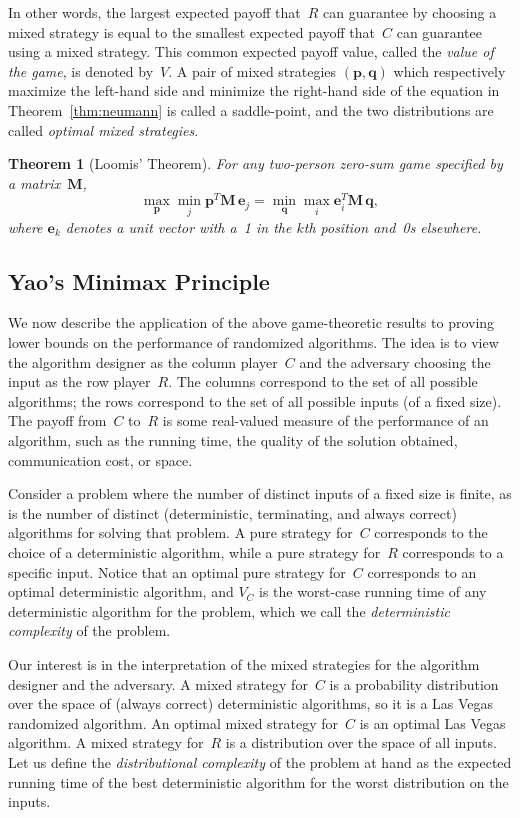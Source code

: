 \documentclass[twoside,12pt]{book}
\theoremstyle{plain}
\newtheorem{theorem}{Theorem}[chapter]
\theoremstyle{definition}
\theoremstyle{remark}
\begin{document}
In other words, the largest expected payoff that~$R$ can guarantee by choosing
a mixed strategy is equal to the smallest expected payoff that~$C$ can
guarantee using a mixed strategy.  This common expected payoff value, called
the \emph{value of the game}, is denoted by~$V$.  A pair of mixed strategies
$(\mathbf{p},\mathbf{q})$ which respectively maximize the left-hand side and
minimize the right-hand side of the equation in Theorem~\ref{thm:neumann} is
called a saddle-point, and the two distributions are called \emph{optimal mixed
strategies}.

\begin{theorem}[Loomis' Theorem]
\label{thm:loomis}
For any two-person zero-sum game specified by a matrix~$\mathbf{M}$,
\[
  \max_{\mathbf{p}} \min_j \mathbf{p}^T\mathbf{M}\,\mathbf{e}_j
  = \min_{\mathbf{q}} \max_i \mathbf{e}_i^T\mathbf{M}\,\mathbf{q},
\]
where $\mathbf{e}_k$ denotes a unit vector with a~1 in the $k$th position
and~0s elsewhere.
\end{theorem}

\subsection{Yao's Minimax Principle}

We now describe the application of the above game-theoretic results to
proving lower bounds on the performance of randomized algorithms.  The idea
is to view the algorithm designer as the column player~$C$ and the adversary
choosing the input as the row player~$R$.  The columns correspond to the set
of all possible algorithms; the rows correspond to the set of all possible
inputs (of a fixed size).  The payoff from~$C$ to~$R$ is some real-valued
measure of the performance of an algorithm, such as the running time, the
quality of the solution obtained, communication cost, or space.

Consider a problem where the number of distinct inputs of a fixed size is
finite, as is the number of distinct (deterministic, terminating, and always
correct) algorithms for solving that problem.  A pure strategy for~$C$
corresponds to the choice of a deterministic algorithm, while a pure strategy
for~$R$ corresponds to a specific input.  Notice that an optimal pure strategy
for~$C$ corresponds to an optimal deterministic algorithm, and $V_C$ is the
worst-case running time of any deterministic algorithm for the problem, which
we call the \emph{deterministic complexity} of the problem.

Our interest is in the interpretation of the mixed strategies for the
algorithm designer and the adversary.  A mixed strategy for~$C$ is a
probability distribution over the space of (always correct) deterministic
algorithms, so it is a Las Vegas randomized algorithm.  An optimal mixed
strategy for~$C$ is an optimal Las Vegas algorithm.  A mixed strategy for~$R$
is a distribution over the space of all inputs.  Let us define the
\emph{distributional complexity} of the problem at hand as the expected
running time of the best deterministic algorithm for the worst distribution
on the inputs.
\end{document}
